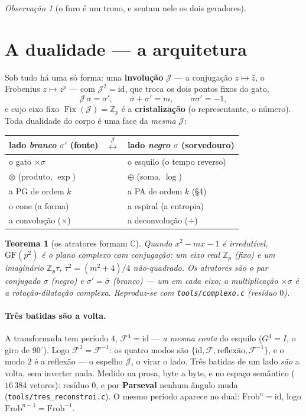 \documentclass[11pt]{article}
\newcommand{\code}[1]{\texttt{\small #1}}
\newcommand{\Z}{\mathbb Z}
\newcommand{\GF}{\mathrm{GF}}
\theoremstyle{plain}
\newtheorem{teorema}{Teorema}
\theoremstyle{remark}
\newtheorem{obs}{Observação}
\begin{document}
\begin{obs}[o furo é um trono, e sentam nele os dois geradores]
\section{A dualidade --- a arquitetura}

Sob tudo há uma só forma: uma \textbf{involução} $\mathcal J$ --- a conjugação $z\mapsto\bar z$, o
Frobenius $z\mapsto z^p$ --- com $\mathcal J^2=\mathrm{id}$, que troca os dois pontos fixos do gato,
\[
 \mathcal J\,\sigma=\sigma',\qquad \sigma+\sigma'=m,\qquad \sigma\sigma'=-1,
\]
e cujo eixo fixo $\operatorname{Fix}(\mathcal J)=\Z_p$ é a \textbf{cristalização} (o representante, o
número). Toda dualidade do corpo é uma face da \emph{mesma} $\mathcal J$:

\begin{center}\small
\begin{tabular}{@{}lcl@{}}
\toprule
lado \emph{branco} $\sigma'$ (fonte) & $\overset{\mathcal J}{\longleftrightarrow}$ & lado \emph{negro} $\sigma$ (sorvedouro)\\
\midrule
o gato $\times\sigma$ & & o esquilo (o tempo reverso)\\
$\otimes$ (produto, $\exp$) & & $\oplus$ (soma, $\log$)\\
a PG de ordem $k$ & & a PA de ordem $k$ \quad(§4)\\
o cone (a forma) & & a espiral (a entropia)\\
a convolução ($\times$) & & a deconvolução ($\div$)\\
\bottomrule
\end{tabular}
\end{center}

\begin{teorema}[os atratores formam $\mathbb C$]
Quando $x^2-mx-1$ é irredutível, $\GF(p^2)$ é o plano complexo com conjugação: um eixo real $\Z_p$
(fixo) e um imaginário $\Z_p\tau$, $\tau^2=(m^2+4)/4$ não-quadrado. Os atratores são o par conjugado
$\sigma$ (negro) e $\sigma'=\bar\sigma$ (branco) --- um em cada eixo; a multiplicação $\times\sigma$
é a rotação-dilatação complexa. Reproduz-se com \code{tools/complexo.c} (resíduo $0$).
\end{teorema}

\paragraph{Três batidas são a volta.} A transformada tem período $4$, $\mathcal F^4=\mathrm{id}$ ---
\emph{a mesma conta} do esquilo ($G^4=I$, o giro de $90^\circ$). Logo $\mathcal F^3=\mathcal F^{-1}$:
os quatro modos são $\{\mathrm{id},\mathcal F,\text{reflexão},\mathcal F^{-1}\}$, e o modo $2$ é a
reflexão --- o espelho $\mathcal J$, o virar o lado. Três batidas de um lado \emph{são} a volta, sem
inverter nada. Medido na prosa, byte a byte, e no espaço semântico ($16\,384$ vetores): resíduo $0$,
e por \textbf{Parseval} nenhum ângulo muda (\code{tools/tres\_reconstroi.c}). O mesmo período aparece
no dual: $\mathrm{Frob}^n=\mathrm{id}$, logo $\mathrm{Frob}^{n-1}=\mathrm{Frob}^{-1}$.


\end{obs}
\end{document}
